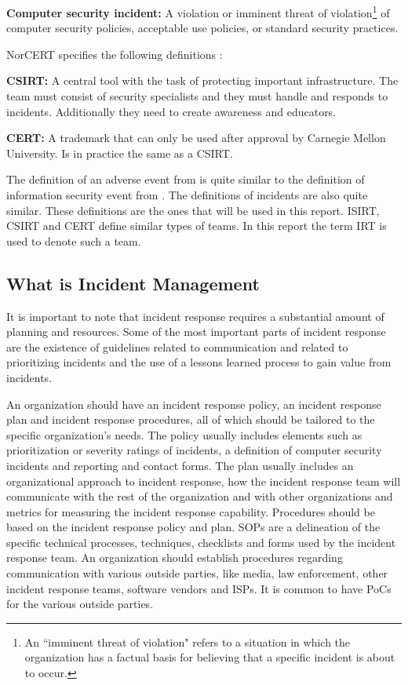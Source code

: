 \textbf{Computer security incident:} A violation or imminent threat of violation\footnote{An ``imminent threat of violation" refers to a situation in which the organization has a factual basis for believing that a specific incident is about to occur.} of computer security policies, acceptable use policies, or standard security practices.

\acs{NorCERT} specifies the following definitions \cite{NorCERT3Kvartal2012}:

\textbf{\ac{CSIRT}:} A central tool with the task of protecting important infrastructure. The team must consist of security specialists and they must handle and responds to incidents. Additionally they need to create awareness and educators.

\textbf{\ac{CERT}:} A trademark that can only be used after approval by Carnegie Mellon University. Is in practice the same as a \acs{CSIRT}.

The definition of an adverse event from \cite{nist800-61} is quite similar to the definition of information security event from \cite{ISO/IEC27000}. The definitions of incidents are also quite similar. These definitions are the ones that will be used in this report. \ac{ISIRT}, \ac{CSIRT} and \ac{CERT} define similar types of teams. In this report the term \acs{IRT} is used to denote such a team. 

\subsection{What is Incident Management}
It is important to note that incident response requires a substantial amount of planning and resources. Some of the most important parts of incident response are the existence of guidelines related to communication and related to prioritizing incidents and the use of a lessons learned process to gain value from incidents. \cite{nist800-61}

An organization should have an incident response policy, an incident response plan and incident response procedures, all of which should be tailored to the specific organization's needs. The policy usually includes elements such as prioritization or severity ratings of incidents, a definition of computer security incidents and reporting and contact forms. The plan usually includes an organizational approach to incident response, how the incident response team will communicate with the rest of the organization and with other organizations and metrics for measuring the incident response capability. Procedures should be based on the incident response policy and plan. \acp{SOP} are a delineation of the specific technical processes, techniques, checklists and forms used by the incident response team. An organization should establish procedures regarding communication with various outside parties, like media, law enforcement, other incident response teams, software vendors and \acp{ISP}. It is common to have \acp{PoC} for the various outside parties. \cite{nist800-61}

